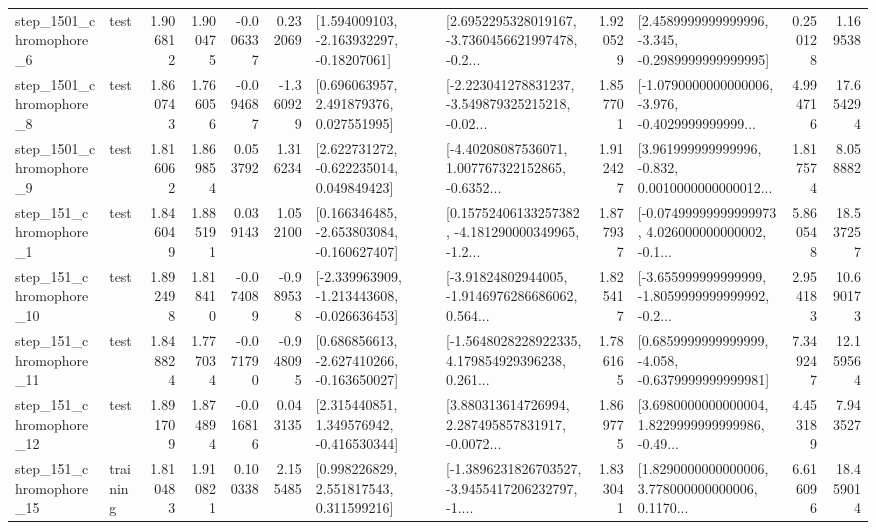 \begin{tabular}{llrrrrllrlrr}
  step\_1501\_chromophore\_6 &      test &      1.906812 &    1.900475 &     -0.006337 &  0.232069 &    [1.594009103, -2.163932297, -0.18207061] &  [2.6952295328019167, -3.7360456621997478, -0.2... &       1.920529 &  [2.4589999999999996, -3.345, -0.2989999999999995] &            0.250128 &          1.169538 \\
  step\_1501\_chromophore\_8 &      test &      1.860743 &    1.766056 &     -0.094687 & -1.360929 &     [0.696063957, 2.491879376, 0.027551995] &  [-2.223041278831237, -3.549879325215218, -0.02... &       1.857701 &  [-1.0790000000000006, -3.976, -0.4029999999999... &            4.994716 &         17.654294 \\
  step\_1501\_chromophore\_9 &      test &      1.816062 &    1.869854 &      0.053792 &  1.316234 &    [2.622731272, -0.622235014, 0.049849423] &  [-4.40208087536071, 1.007767322152865, -0.6352... &       1.912427 &  [3.961999999999996, -0.832, 0.0010000000000012... &            1.817574 &          8.058882 \\
   step\_151\_chromophore\_1 &      test &      1.846049 &    1.885191 &      0.039143 &  1.052100 &   [0.166346485, -2.653803084, -0.160627407] &  [0.15752406133257382, -4.181290000349965, -1.2... &       1.877937 &  [-0.07499999999999973, 4.026000000000002, -0.1... &            5.860548 &         18.537257 \\
  step\_151\_chromophore\_10 &      test &      1.892498 &    1.818410 &     -0.074089 & -0.989538 &  [-2.339963909, -1.213443608, -0.026636453] &  [-3.91824802944005, -1.9146976286686062, 0.564... &       1.825417 &  [-3.655999999999999, -1.8059999999999992, -0.2... &            2.954183 &         10.690173 \\
  step\_151\_chromophore\_11 &      test &      1.848824 &    1.777034 &     -0.071790 & -0.948095 &   [0.686856613, -2.627410266, -0.163650027] &  [-1.5648028228922335, 4.179854929396238, 0.261... &       1.786165 &  [0.6859999999999999, -4.058, -0.6379999999999981] &            7.349247 &         12.159564 \\
  step\_151\_chromophore\_12 &      test &      1.891709 &    1.874894 &     -0.016816 &  0.043135 &    [2.315440851, 1.349576942, -0.416530344] &  [3.880313614726994, 2.287495857831917, -0.0072... &       1.869775 &  [3.6980000000000004, 1.8229999999999986, -0.49... &            4.453189 &          7.943527 \\
  step\_151\_chromophore\_15 &  training &      1.810483 &    1.910821 &      0.100338 &  2.155485 &     [0.998226829, 2.551817543, 0.311599216] &  [-1.3896231826703527, -3.9455417206232797, -1.... &       1.833041 &  [1.8290000000000006, 3.778000000000006, 0.1170... &            6.616096 &         18.459014 \\

\end{tabular}
